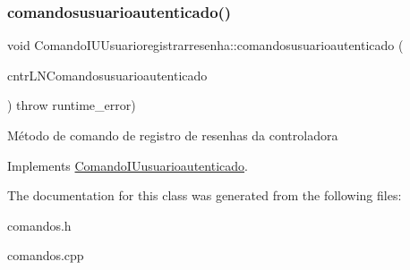 \subsubsection{\texorpdfstring{comandosusuarioautenticado()}{comandosusuarioautenticado()}}
{\footnotesize\ttfamily void Comando\+I\+U\+Usuarioregistrarresenha\+::comandosusuarioautenticado (\begin{DoxyParamCaption}\item[{\hyperlink{classILNComandosusuarioautenticado}{I\+L\+N\+Comandosusuarioautenticado} $\ast$}]{cntr\+L\+N\+Comandosusuarioautenticado }\end{DoxyParamCaption}) throw  runtime\+\_\+error) \hspace{0.3cm}{\ttfamily [virtual]}}

Método de comando de registro de resenhas da controladora 

Implements \hyperlink{classComandoIUusuarioautenticado}{Comando\+I\+Uusuarioautenticado}.



The documentation for this class was generated from the following files\+:\begin{DoxyCompactItemize}
\item 
comandos.\+h\item 
comandos.\+cpp\end{DoxyCompactItemize}
